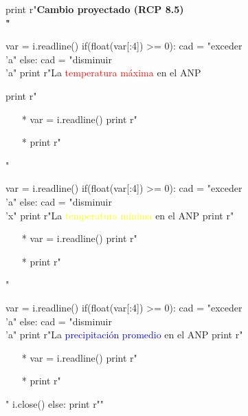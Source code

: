 \documentclass{article}
\begin{document}
\begin{python}
{		      print r"\bf{Cambio proyectado (RCP 8.5)\\}"
		      
		      var = i.readline()
		      if(float(var[:4]) >= 0):
		         cad = "exceder\\'a"
		      else:
		         cad = "disminuir\\'a"
		      print r"La \textcolor{red}{temperatura m\'axima} en el ANP %
		      
		      print r"\begin{itemize}"
		      print r"\setlength\itemsep{1em}"
		      print r"\item[*] %
		      var = i.readline()
		      print r"\item[*] %
		      print r"\end{itemize}"

		      var = i.readline()
		      if(float(var[:4]) >= 0):
		         cad = "exceder\\'a"
		      else:
		         cad = "disminuir\\'x"
		      print r"La \textcolor{yellow}{temperatura m\'inima} en el ANP %
		      print r"\begin{itemize}"
		      print r"\setlength\itemsep{0em}"
		      print r"\item[*] %
		      var = i.readline()
		      print r"\item[*] %
		      print r"\end{itemize}"

		      var = i.readline()
		      if(float(var[:4]) >= 0):
		         cad = "exceder\\'a"
		      else:
		         cad = "disminuir\\'a"
		      print r"La \textcolor{blue}{precipitaci\'on promedio} en el ANP %
		      print r"\begin{itemize}"
		      print r"\item[*] %
		      var = i.readline()
		      print r"\item[*] %
		      print r"\end{itemize}"
		      i.close()
		   else:
		      print r""

}
\end{python}
\end{document}
